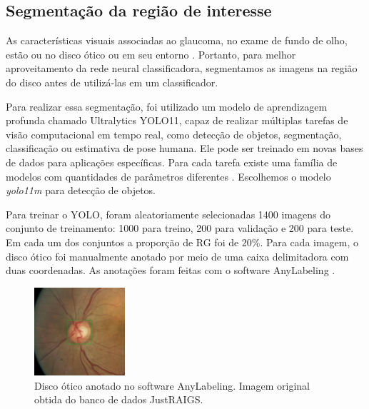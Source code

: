 \documentclass[12pt]{article}
\begin{document}



\subsection{Segmentação da região de interesse}
\label{sec:segmentation}

As características visuais associadas ao glaucoma, no exame de fundo de olho, estão ou no disco ótico ou em seu entorno \cite{weinreb_2016}. Portanto, para melhor aproveitamento da rede neural classificadora, segmentamos as imagens na região do disco antes de utilizá-las em um classificador.

Para realizar essa segmentação, foi utilizado um modelo de aprendizagem profunda chamado Ultralytics YOLO11, capaz de realizar múltiplas tarefas de visão computacional em tempo real, como detecção de objetos, segmentação, classificação ou estimativa de pose humana. Ele pode ser treinado em novas bases de dados para aplicações específicas. Para cada tarefa existe uma família de modelos com quantidades de parâmetros diferentes \cite{YOLO_2023}. Escolhemos o modelo \emph{yolo11m} para detecção de objetos.

Para treinar o YOLO, foram aleatoriamente selecionadas 1400 imagens do conjunto de treinamento: 1000 para treino, 200 para validação e 200 para teste. Em cada um dos conjuntos a proporção de RG foi de 20\%. Para cada imagem, o disco ótico foi manualmente anotado por meio de uma caixa delimitadora com duas coordenadas. As anotações foram feitas com o software AnyLabeling \cite{anylabeling}.

\begin{figure}[htb]
 \centering
 \includegraphics[width=0.3\textwidth]{images/disk_labeling.png}
 \caption{Disco ótico anotado no software AnyLabeling. Imagem original obtida do banco de dados JustRAIGS.}
 \label{fig:disk_labeling}
\end{figure}
\end{document}
